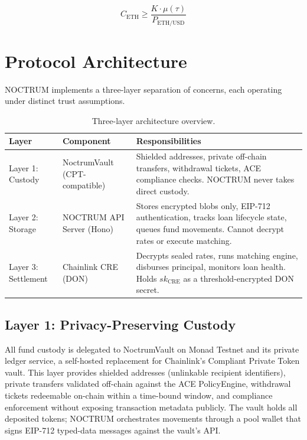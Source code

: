 \documentclass[a4paper,11pt]{article}
\begin{document}
\begin{equation}
    C_{\mathrm{ETH}} \geq \frac{K \cdot \mu(\tau)}{P_{\mathrm{ETH/USD}}}
    \label{eq:crosscollateral}
\end{equation}

\section{Protocol Architecture}

NOCTRUM implements a three-layer separation of concerns, each operating under
distinct trust assumptions.

\begin{table}[H]
\centering
\caption{Three-layer architecture overview.}
\renewcommand{\arraystretch}{1.4}
\begin{tabular}{@{}p{}p{}p{}@{}}
  \toprule
  \textbf{Layer} & \textbf{Component} & \textbf{Responsibilities} \\
  \midrule
  Layer 1: Custody & NoctrumVault (CPT-compatible) &
    Shielded addresses, private off-chain transfers, withdrawal tickets,
    ACE compliance checks. NOCTRUM never takes direct custody. \\
  Layer 2: Storage & NOCTRUM API Server (Hono) &
    Stores encrypted blobs only, EIP-712 authentication, tracks loan
    lifecycle state, queues fund movements. Cannot decrypt rates or
    execute matching. \\
  Layer 3: Settlement & Chainlink CRE (DON) &
    Decrypts sealed rates, runs matching engine, disburses principal,
    monitors loan health. Holds $sk_{\mathrm{CRE}}$ as a
    threshold-encrypted DON secret. \\
  \bottomrule
\end{tabular}
\end{table}

\subsection{Layer 1: Privacy-Preserving Custody}

All fund custody is delegated to NoctrumVault on Monad Testnet and its
private ledger service, a self-hosted replacement for Chainlink's
Compliant Private Token vault. This layer provides shielded addresses
(unlinkable recipient identifiers), private transfers validated off-chain
against the ACE PolicyEngine, withdrawal tickets redeemable on-chain within
a time-bound window, and compliance enforcement without exposing transaction
metadata publicly. The vault holds all deposited tokens; NOCTRUM orchestrates
movements through a pool wallet that signs EIP-712 typed-data messages
against the vault's API.
\end{document}
